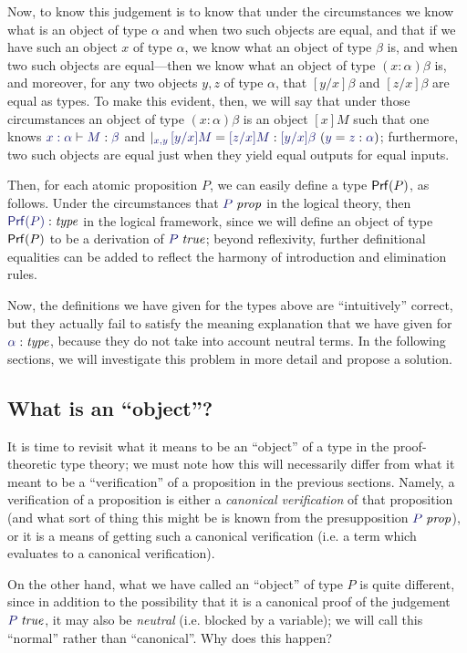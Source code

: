 \documentclass[main.tex]{subfiles}
\begin{document}
Now, to know this judgement is to know that under the circumstances we
know what is an object of type $\alpha$ and when two such objects are
equal, and that if we have such an object $x$ of type $\alpha$, we
know what an object of type $\beta$ is, and when two such objects are
equal---then we know what an object of type $(x:\alpha)\beta$ is, and
moreover, for any two objects $y,z$ of type $\alpha$, that
$[y/x]\beta$ and $[z/x]\beta$ are equal as types. To make this
evident, then, we will say that under those circumstances an object of
type $(x:\alpha)\beta$ is an object $[x]M$ such that one knows
$\lfsequent{x:\alpha}{\ofty{M}{\beta}}$ and $\genj{x,y}{\hyp{\eofty{[y/x]M}{[z/x]M}{[y/x]\beta}}{\eofty{y}{z}{\alpha}}}$;
furthermore, two such objects are equal just when they yield equal
outputs for equal inputs.

Then, for each atomic proposition $P$, we can easily
define a type $\mathsf{Prf}(P)$, as follows. Under the circumstances that
$\isprop{P}$ in the logical theory, then $\type{\prf{P}}$ in the
logical framework, since we will define an object of type $\mathsf{Prf}(P)$ to
be a derivation of $\istrue{P}$; beyond reflexivity,
further definitional equalities can be added to reflect the harmony of
introduction and elimination rules.

Now, the definitions we have given for the types above are
``intuitively'' correct, but they actually fail to satisfy the meaning
explanation that we have given for $\type\alpha$, because they do not
take into account neutral terms. In the following sections, we will
investigate this problem in more detail and propose a solution.

\subsection{What is an ``object''?}
It is time to revisit what it means to be an ``object'' of a type in the
proof-theoretic type theory; we must note how this will necessarily differ from
what it meant to be a ``verification'' of a proposition in the previous
sections. Namely, a verification of a proposition is either a \emph{canonical
verification} of that proposition (and what sort of thing this might be is
known from the presupposition $\isprop{P}$), or it is a means of getting such
a canonical verification (i.e. a term which evaluates to a canonical
verification).

On the other hand, what we have called an ``object'' of type $P$ is quite
different, since in addition to the possibility that it is a canonical proof of
the judgement $\istrue{P}$, it may also be \emph{neutral} (i.e. blocked by a
variable); we will call this ``normal'' rather than ``canonical''. Why does
this happen?
\end{document}
